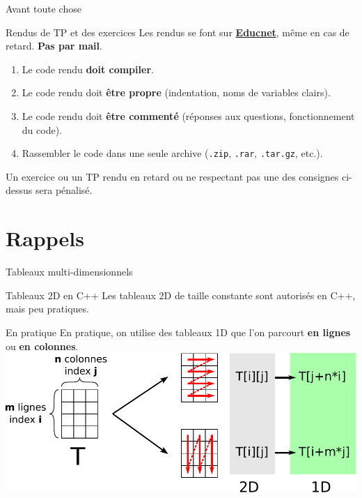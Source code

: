 
\author[nicolas.audebert@onera.fr]{Nicolas Audebert}
\date[17 nov. 2017]{Vendredi 17 novembre 2017}
\subtitle{Les objets}
\maketitle

\begin{frame}{Avant toute chose}
  \begin{alertblock}{Rendus de TP et des exercices}
  Les rendus se font sur \href{https://educnet.enpc.fr}{\textbf{Educnet}}, même en cas de retard. \textbf{Pas par mail}.
  \begin{enumerate}
  	\item Le code rendu \textbf{doit compiler}.
    \item Le code rendu doit \textbf{être propre} (indentation, noms de variables clairs).
    \item Le code rendu doit \textbf{être commenté} (réponses aux questions, fonctionnement du code).
    \item Rassembler le code dans une seule archive (\texttt{.zip}, \texttt{.rar}, \texttt{.tar.gz}, etc.).
  \end{enumerate}
  Un exercice ou un TP rendu en retard ou ne respectant pas une des consignes ci-dessus sera pénalisé.
  \end{alertblock}

\end{frame}

\section{Rappels}

\begin{frame}[fragile=singleslide]{Tableaux multi-dimensionnels}

\begin{alertblock}{Tableaux 2D en C++}
Les tableaux 2D de taille constante sont autorisés en C++, mais peu pratiques.
\end{alertblock}

\begin{exampleblock}{En pratique}
  En pratique, on utilise des tableaux 1D que l'on parcourt \textbf{en lignes} ou \textbf{en colonnes}.
  \includegraphics[width=0.9\linewidth]{images/parcours.pdf}
\end{exampleblock}
\end{frame}


